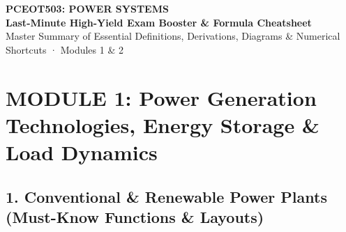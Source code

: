 \documentclass[10pt,a4paper]{article}
\begin{document}
\begin{center}
  {\LARGE\bfseries\sffamily\color{AnthDark} PCEOT503: POWER SYSTEMS}\\[0.2em]
  {\large\sffamily\color{AnthOrange}\textbf{Last-Minute High-Yield Exam Booster \& Formula Cheatsheet}}\\[0.2em]
  {\footnotesize\sffamily\color{AnthMidGray} Master Summary of Essential Definitions, Derivations, Diagrams \& Numerical Shortcuts · Modules 1 \& 2}
\end{center}
\vspace{-0.5em}

\section{MODULE 1: Power Generation Technologies, Energy Storage \& Load Dynamics}

\subsection{1. Conventional \& Renewable Power Plants (Must-Know Functions \& Layouts)}
\end{document}
